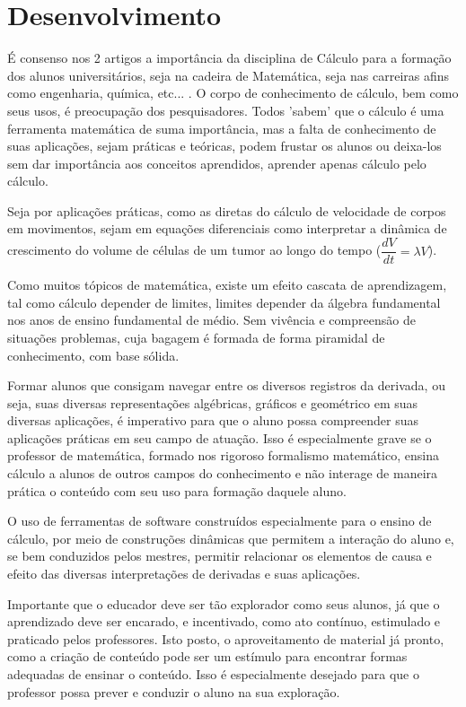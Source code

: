 \documentclass[
	12pt,				%
	openright,			%
	oneside,
	a4paper,			%
	chapter=TITLE,		%
	section=TITLE,		%
	sumario=abnt-6027-2012,
	english,			%
	brazil				%
]{abntex2}
\begin{document}
			
\chapter{Desenvolvimento}

	É consenso nos 2 artigos a importância da disciplina de Cálculo para a formação dos alunos universitários, seja na cadeira de Matemática, seja nas carreiras afins como engenharia, química, etc... . O corpo de conhecimento de cálculo, bem como seus usos, é preocupação dos pesquisadores. Todos 'sabem' que o cálculo é uma ferramenta matemática de suma importância, mas a falta de conhecimento de suas aplicações, sejam práticas e teóricas, podem frustar os alunos ou deixa-los sem dar importância aos conceitos aprendidos, aprender apenas cálculo pelo cálculo.
	
	Seja por aplicações práticas, como as diretas do cálculo de velocidade de corpos em movimentos, sejam em equações diferenciais como interpretar a dinâmica de crescimento do volume de células de um tumor ao longo do tempo ($ \dfrac{dV}{dt} = \lambda V $).
	
	Como muitos tópicos de matemática, existe um efeito cascata de aprendizagem, tal como cálculo depender de limites, limites depender da álgebra fundamental nos anos de ensino fundamental de médio. Sem vivência e compreensão de situações problemas, cuja bagagem é formada de forma piramidal de conhecimento, com base sólida.
	
	Formar alunos que consigam navegar entre os diversos registros da derivada, ou seja, suas diversas representações algébricas, gráficos e geométrico em suas diversas aplicações, é imperativo para que o aluno possa compreender suas aplicações práticas em seu campo de atuação. Isso é especialmente grave se o professor de matemática, formado nos rigoroso formalismo matemático, ensina cálculo a alunos de outros campos do conhecimento e não interage de maneira prática o conteúdo com seu uso para formação daquele aluno.
	
	O uso de ferramentas de software construídos especialmente para o ensino de cálculo, por meio de construções dinâmicas que permitem a interação do aluno e, se bem conduzidos pelos mestres, permitir relacionar os elementos de causa e efeito das diversas interpretações de derivadas e suas aplicações.
	
	Importante que o educador deve ser tão explorador como seus alunos, já que o aprendizado deve ser encarado, e incentivado, como ato contínuo, estimulado e praticado pelos professores. Isto posto, o aproveitamento de material já pronto, como a criação de conteúdo pode ser um estímulo para encontrar formas adequadas de ensinar o conteúdo. Isso é especialmente desejado para que o professor possa prever e conduzir o aluno na sua exploração.
	
\end{document}
